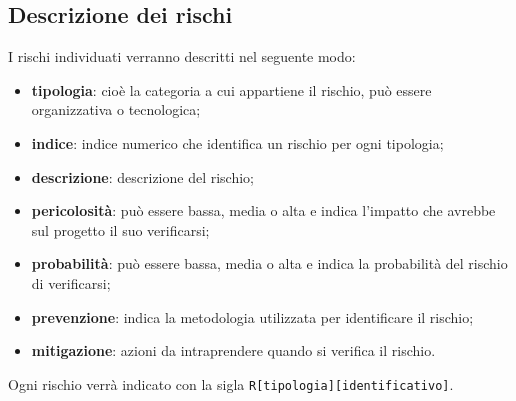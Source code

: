 \subsection{Descrizione dei rischi}
I rischi individuati verranno descritti nel seguente modo:
\begin{itemize}
    \item \textbf{tipologia}: cioè la categoria a cui appartiene il rischio, può essere organizzativa o tecnologica;
    \item \textbf{indice}: indice numerico che identifica un rischio per ogni tipologia;
    \item \textbf{descrizione}: descrizione del rischio;
    \item \textbf{pericolosità}: può essere bassa, media o alta e indica l'impatto che avrebbe sul progetto il suo verificarsi;
    \item \textbf{probabilità}: può essere bassa, media o alta e indica la probabilità del rischio di verificarsi;
    \item \textbf{prevenzione}: indica la metodologia utilizzata per identificare il rischio;
    \item \textbf{mitigazione}: azioni da intraprendere quando si verifica il rischio.   
\end{itemize}
Ogni rischio verrà indicato con la sigla \texttt{R[tipologia][identificativo]}.